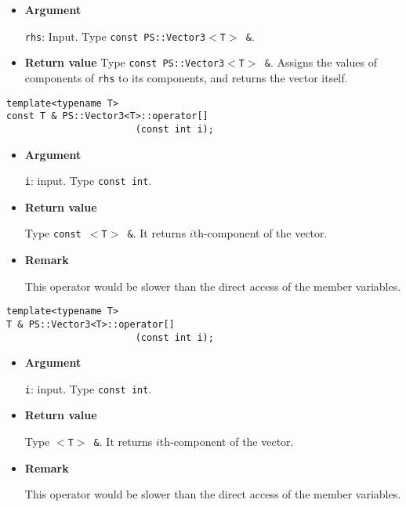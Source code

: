\begin{itemize}

\item{{\bf Argument}}

\texttt{rhs}: Input. Type \texttt{const PS::Vector3$<$T$>$ \&}.

\item{{\bf Return value}}
Type \texttt{const PS::Vector3$<$T$>$ \&}. Assigns the values of components of \texttt{rhs}
to its components, and returns the vector itself.

\end{itemize}



\begin{screen}
\begin{verbatim}
template<typename T>
const T & PS::Vector3<T>::operator[]
                       (const int i);
\end{verbatim}
\end{screen}

\begin{itemize}

\item{{\bf Argument}}

\texttt{i}: input. Type \texttt{const int}.

\item{{\bf Return value}}

Type \texttt{const $<$T$>$ \&}. It returns $i$th-component of the vector.

\item{{\bf Remark}}

This operator would be slower than the direct access of the member variables.

\end{itemize}

\begin{screen}
\begin{verbatim}
template<typename T>
T & PS::Vector3<T>::operator[]
                       (const int i);
\end{verbatim}
\end{screen}

\begin{itemize}

\item{{\bf Argument}}

\texttt{i}: input. Type \texttt{const int}.

\item{{\bf Return value}}

Type \texttt{$<$T$>$ \&}. It returns $i$th-component of the vector.

\item{{\bf Remark}}

This operator would be slower than the direct access of the member variables.

\end{itemize}

